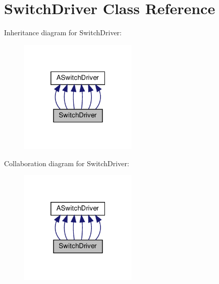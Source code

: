 \hypertarget{classSwitchDriver}{}\section{Switch\+Driver Class Reference}
\label{classSwitchDriver}


Inheritance diagram for Switch\+Driver\+:
\nopagebreak
\begin{figure}[H]
\begin{center}
\leavevmode
\includegraphics[width=160pt]{classSwitchDriver__inherit__graph}
\end{center}
\end{figure}


Collaboration diagram for Switch\+Driver\+:
\nopagebreak
\begin{figure}[H]
\begin{center}
\leavevmode
\includegraphics[width=160pt]{classSwitchDriver__coll__graph}
\end{center}
\end{figure}
